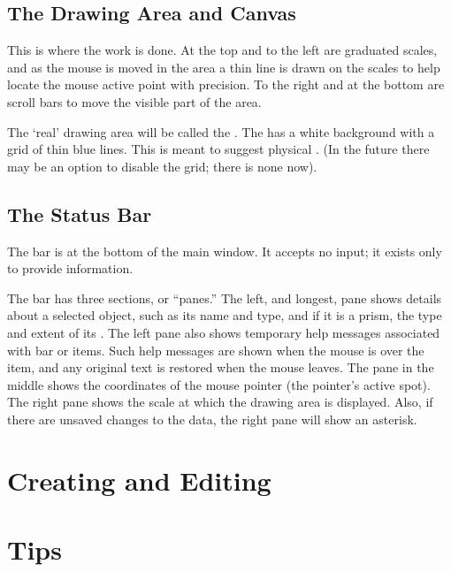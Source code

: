 		\subsection{The Drawing Area and Canvas}%
		This is where the work is done. At the top and
		to the left are graduated scales, and as the mouse
		is moved in the  area a thin line
		is drawn on the scales to help locate the mouse active
		point with precision. To the right and at the bottom
		are scroll bars to move the visible part of the
		 area.
		
		The `real' drawing area will be called the
		.
		The  has a white background with a grid
		of thin blue lines. This is meant to suggest physical
		. (In the future there
		may be an option to disable the grid; there is none now).


		\subsection{The Status Bar}%
		The  bar is at the bottom of
		the main window. It accepts no input; it exists
		only to provide information.
		
		The 
		bar has three sections, or ``panes.'' The left, and
		longest, pane shows details about a selected object,
		such as its name and type, and if it is a prism, the
		type and extent of its . The left
		pane also shows temporary help messages associated
		with  bar or  items. Such help
		messages are shown when the mouse is over the item, and
		any original text is restored when the mouse leaves.
		The pane in the middle shows the coordinates of the
		mouse pointer (the pointer's active spot). The right
		pane shows the scale at which the drawing area is displayed.
		Also, if there are unsaved changes to the data, the
		right pane will show an asterisk.


	\section{Creating and Editing}%

	\section{Tips}%


